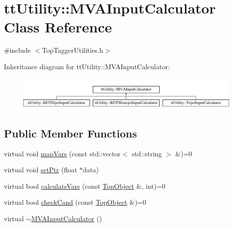 \hypertarget{classttUtility_1_1MVAInputCalculator}{\section{tt\-Utility\-:\-:M\-V\-A\-Input\-Calculator Class Reference}
\label{classttUtility_1_1MVAInputCalculator}
}


{\ttfamily \#include $<$Top\-Tagger\-Utilities.\-h$>$}

Inheritance diagram for tt\-Utility\-:\-:M\-V\-A\-Input\-Calculator\-:\begin{figure}[H]
\begin{center}
\leavevmode
\includegraphics[height=1.728395cm]{classttUtility_1_1MVAInputCalculator}
\end{center}
\end{figure}
\subsection*{Public Member Functions}
\begin{DoxyCompactItemize}
\item 
virtual void \hyperlink{classttUtility_1_1MVAInputCalculator_aca315e5c5ce1d110660eb54cd7facfd8}{map\-Vars} (const std\-::vector$<$ std\-::string $>$ \&)=0
\item 
virtual void \hyperlink{classttUtility_1_1MVAInputCalculator_afae8a686f0fd4310a75c79216a39fa53}{set\-Ptr} (float $\ast$data)
\item 
virtual bool \hyperlink{classttUtility_1_1MVAInputCalculator_a86793cfa66ca816b2e1667a6b12db7d8}{calculate\-Vars} (const \hyperlink{classTopObject}{Top\-Object} \&, int)=0
\item 
virtual bool \hyperlink{classttUtility_1_1MVAInputCalculator_ae8df426d7943b921c0b9d086d1ccde30}{check\-Cand} (const \hyperlink{classTopObject}{Top\-Object} \&)=0
\item 
virtual \hyperlink{classttUtility_1_1MVAInputCalculator_affa17a79ff6326b86391420e29a82554}{$\sim$\-M\-V\-A\-Input\-Calculator} ()
\end{DoxyCompactItemize}
